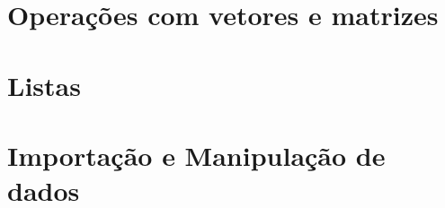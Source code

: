 \documentclass[
]{book}
\begin{document}
\hypertarget{operauxe7uxf5es-com-vetores-e-matrizes}{%
\section{Operações com vetores e matrizes}\label{operauxe7uxf5es-com-vetores-e-matrizes}}

\hypertarget{listas}{%
\section{Listas}\label{listas}}

\hypertarget{importauxe7uxe3o-e-manipulauxe7uxe3o-de-dados}{%
\section{Importação e Manipulação de dados}\label{importauxe7uxe3o-e-manipulauxe7uxe3o-de-dados}}

  
\end{document}
